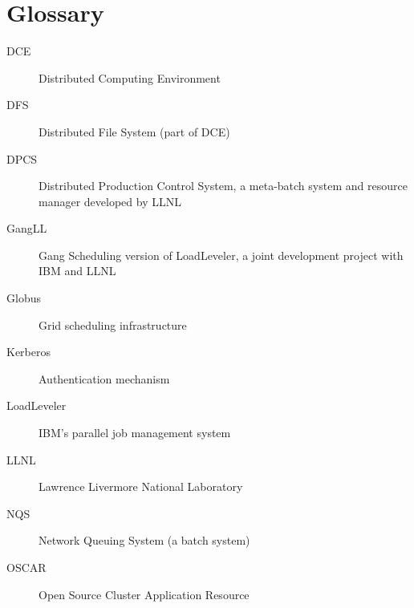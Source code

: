 \appendix
\newpage

\section{Glossary}

\begin{description}
\item[DCE]	Distributed Computing Environment
\item[DFS]	Distributed File System (part of DCE)
\item[DPCS]	Distributed Production Control System, a meta-batch system 
		and resource manager developed by LLNL
\item[GangLL]	Gang Scheduling version of LoadLeveler, a joint development 
		project with IBM and LLNL
\item[Globus]	Grid scheduling infrastructure
\item[Kerberos]	Authentication mechanism
\item[LoadLeveler] IBM's parallel job management system
\item[LLNL]	Lawrence Livermore National Laboratory
\item[NQS]	Network Queuing System (a batch system)
\item[OSCAR]	Open Source Cluster Application Resource
\end{description}

\newpage


